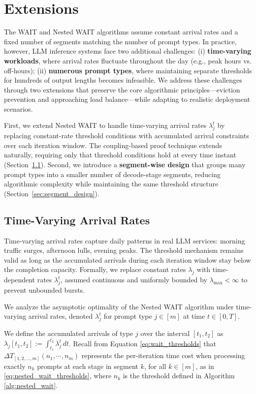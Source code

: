 \section{Extensions}\label{sec:extension}

The WAIT and Nested WAIT algorithms assume constant arrival rates and a fixed number of segments matching the number of prompt types. In practice, however, LLM inference systems face two additional challenges: (i) \textbf{time-varying workloads}, where arrival rates fluctuate throughout the day (e.g., peak hours vs. off-hours); (ii) \textbf{numerous prompt types}, where maintaining separate thresholds for hundreds of output lengths becomes infeasible. We address these challenges through two extensions that preserve the core algorithmic principles—eviction prevention and approaching load balance—while adapting to realistic deployment scenarios.

First, we extend Nested WAIT to handle time-varying arrival rates $\lambda_j^t$ by replacing constant-rate threshold conditions with accumulated arrival constraints over each iteration window. The coupling-based proof technique extends naturally, requiring only that threshold conditions hold at every time instant (Section~\ref{sec:time_varying}). Second, we introduce a \textbf{segment-wise design} that groups many prompt types into a smaller number of decode-stage segments, reducing algorithmic complexity while maintaining the same threshold structure (Section~\ref{sec:segment_design}).

\subsection{Time-Varying Arrival Rates}\label{sec:time_varying}

Time-varying arrival rates capture daily patterns in real LLM services: morning traffic surges, afternoon lulls, evening peaks. The threshold mechanism remains valid as long as the accumulated arrivals during each iteration window stay below the completion capacity. Formally, we replace constant rates $\lambda_j$ with time-dependent rates $\lambda_j^t$, assumed continuous and uniformly bounded by $\lambda_{\max} < \infty$ to prevent unbounded bursts.

We analyze the asymptotic optimality of the Nested WAIT algorithm under time-varying arrival rates, denoted $\lambda_j^t$ for prompt type $j \in [m]$ at time $t \in [0, T]$.

We define the accumulated arrivals of type $j$ over the interval $[t_1, t_2]$ as $\lambda_j[t_1, t_2] := \int_{t_1}^{t_2} \lambda_j^t \, dt$. Recall from Equation \eqref{eq:wait_thresholds} that $\Delta T_{[1,2,\dots,m]}(n_1,\cdots,n_m)$ represents the per-iteration time cost when processing exactly $n_k$ prompts at each stage in segment $k$, for all $k \in [m]$, as in \eqref{eq:nested_wait_thresholds}, where $n_k$ is the threshold defined in Algorithm \ref{alg:nested_wait}.

